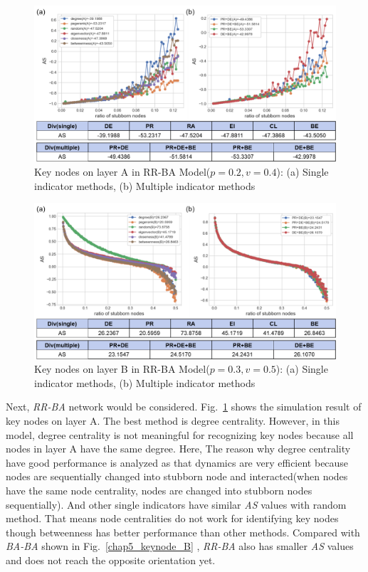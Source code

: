 \begin{figure}[!htb]
	\centering
	\includegraphics[width=\hsize]{figure/chap5_keynode_RR_BA_A.png}
	\caption{Key nodes on layer A in RR-BA Model($p=0.2, v=0.4$):
		(a) Single indicator methods, (b) Multiple indicator methods}
	\label{chap5_keynode_RR_BA_A}
\end{figure}
\begin{figure}[!htb]
	\centering
	\includegraphics[width=\hsize]{figure/chap5_keynode_RR_BA_B.png}
	\caption{Key nodes on layer B in RR-BA Model($p=0.3, v=0.5$):
		(a) Single indicator methods, (b) Multiple indicator methods}
	\label{chap5_keynode_RR_BA_B}
\end{figure}
Next, \textit{RR-BA} network would be considered. Fig.~\ref{chap5_keynode_RR_BA_A} shows the simulation result of key nodes on layer A. The best method is degree centrality. However, in this model, degree centrality is not meaningful for recognizing key nodes because all nodes in layer A have the same degree. Here, The reason why degree centrality have good performance is analyzed as that dynamics are very efficient because nodes are sequentially changed into stubborn node and interacted(when nodes have the same node centrality, nodes are changed into stubborn nodes sequentially). And other single indicators have similar \textit{AS} values with random method. That means node centralities do not work for identifying key nodes though betweenness has better performance than other methods. Compared with \textit{BA-BA} shown in Fig.~\ref{chap5_keynode_B} , \textit{RR-BA} also has smaller \textit{AS} values and does not reach the opposite orientation yet. \\
